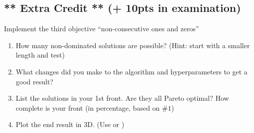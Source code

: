 \documentclass{article}
\begin{document}
\subsection{** Extra Credit ** (+ 10pts in examination)}
Implement the third objective ``non-consecutive ones and zeros''
\begin{enumerate}
	\item How many non-dominated solutions are possible? (Hint: start with a smaller length and test)
	\item What changes did you make to the algorithm and hyperparameters to get a good result?
	\item List the solutions in your 1st front. Are they all Pareto optimal? How complete is your front (in percentage, based on $\#1$)
	\item Plot the end result in 3D. (Use  or )
\end{enumerate}
\end{document}
